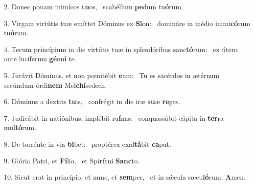 2. Donec ponam inimícos \textbf{tu}os, \ast\  scabéllum \textbf{pe}dum tu\textbf{ó}rum.\

3. Virgam virtútis tuæ emíttet Dóminus ex \textbf{Si}on: \ast\  domináre in médio inimi\textbf{có}rum tu\textbf{ó}rum.\

4. Tecum princípium in die virtútis tuæ in splendóribus sanc\textbf{tó}rum: \ast\  ex útero ante lucíferum \textbf{gé}nu\textbf{i} te.\

5. Jurávit Dóminus, et non pœnitébit \textbf{e}um: \ast\  Tu es sacérdos in ætérnum secúndum órdi\textbf{nem} Mel\textbf{chí}sedech.\

6. Dóminus a dextris \textbf{tu}is, \ast\  confrégit in die iræ \textbf{su}æ \textbf{re}ges.\

7. Judicábit in natiónibus, implébit ru\textbf{í}nas: \ast\  conquassábit cápita in \textbf{ter}ra mul\textbf{tó}rum.\

8. De torrénte in via \textbf{bi}bet: \ast\  proptérea exal\textbf{tá}bit \textbf{ca}put.\

9. Glória Patri, et \textbf{Fí}lio, \ast\  et Spi\textbf{rí}tui \textbf{Sanc}to.\

10. Sicut erat in princípio, et nunc, et \textbf{sem}per, \ast\  et in sǽcula sæcu\textbf{ló}rum. \textbf{A}men.\

